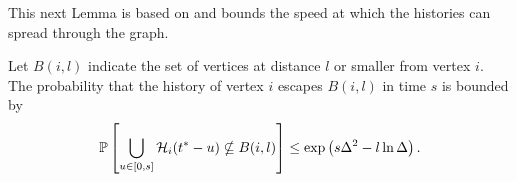 


	This next Lemma is based on \cite[Lemma 2.1]{Lubetzky2016-wd} and bounds the speed at which the histories can spread through the graph.
		\begin{lemma}
		\label{lem:prob history contained in ball}
			Let $B(i, l)$ indicate the set of vertices at distance $l$ or smaller from vertex $i$. The probability that the history of vertex $i$ escapes $B(i,l)$ in time $s$ is bounded by
			\begin{equation}
				\mathbb{P}\left[\bigcup_{u \in [0, s]}\mathcal{H}_i(t^* - u) \nsubseteq B(i, l)\right] \leq \exp\left(s \Delta^2 - l \ln \Delta \right).
			\end{equation}
		\end{lemma}
